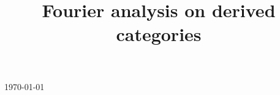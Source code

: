 

\title{Fourier analysis on derived categories}

\usepackage[sort=standard]{glossaries} 
\makeglossaries



\maketitle
\centerline{\today}
\tableofcontents







